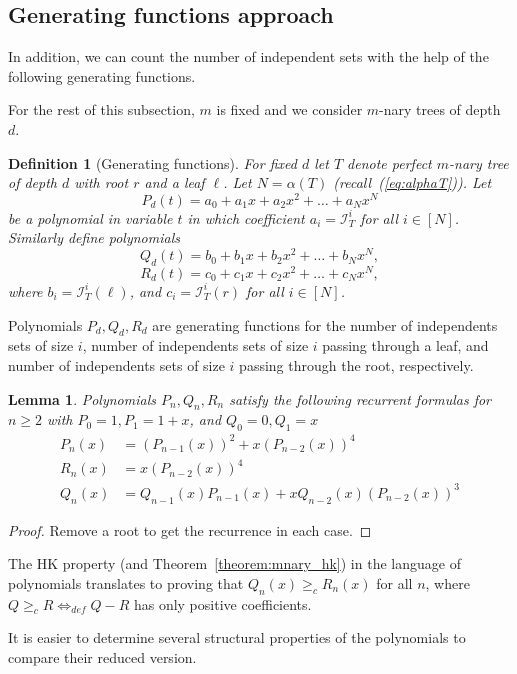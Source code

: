 \documentclass{amsart}
\newtheorem{lemma}[theorem]{Lemma}
\newtheorem{definition}[theorem]{Definition}
\theoremstyle{definition}
\newcommand\II{{\mathcal I}}
\begin{document}
\newpage
\subsection{Generating functions approach}

In addition, we can count the number of independent sets with the help of the following generating functions.

For the rest of this subsection, $m$ is fixed and we consider $m$-nary trees of depth $d$.

\begin{definition}[Generating functions]
For fixed $d$ let $T$ denote perfect $m$-nary tree of depth $d$ with root $r$ and a leaf $\ell$. Let $N=\alpha(T)$ (recall~(\ref{eq:alphaT})). Let $$P_{d}(t)=a_0+a_1x+a_2x^2+\ldots +a_N x^{N}$$ be a polynomial in variable $t$ in which coefficient $a_i=\II^{i}_{T}$ for all $i\in [N]$.
Similarly define polynomials 
$$Q_d(t)=b_0+b_1x+b_2x^2+\ldots +b_N x^{N},$$
$$R_d(t)=c_0+c_1x+c_2x^2+\ldots +c_N x^{N},$$
where $b_i=\II^{i}_{T}(\ell)$, and $c_i=\II^{i}_T(r)$ for all $i\in[N]$.
\end{definition}
Polynomials $P_d, Q_d, R_d$ are generating functions for the number of independents sets of size $i$, number of independents sets of size $i$ passing through a leaf, and number of independents sets of size $i$ passing through the root, respectively.

\begin{lemma}\label{lemma:generating_def}
Polynomials $P_n, Q_n, R_n$ satisfy the following recurrent formulas for $n\geq 2$ with $P_{0}=1, P_1=1+x$, and $Q_{0}=0, Q_1=x$ 
\begin{align*}
    P_n(x) &= (P_{n - 1}(x))^2 + x(P_{n - 2}(x))^4  \\
    R_n(x) &= x(P_{n - 2}(x))^4  \\
    Q_n(x) &= Q_{n - 1}(x)P_{n - 1}(x) + xQ_{n - 2}(x)(P_{n - 2}(x))^3
\end{align*}
\end{lemma}
\begin{proof}
Remove a root to get the recurrence in each case.
\end{proof}

The HK property (and Theorem~\ref{theorem:mnary_hk}) in the language of polynomials translates to proving that $Q_{n}(x)\geq_{c} R_{n}(x)$ for all $n$, where $Q\geq _c R \Leftrightarrow_{def} Q-R$ has only positive coefficients.

It is easier to determine several structural properties of the polynomials to compare their reduced version. 
\end{document}
